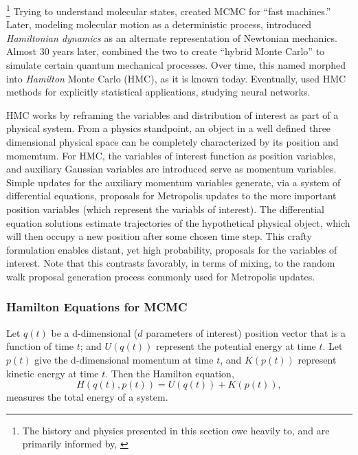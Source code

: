\footnote{The history and physics presented in this section owe heavily to, and are primarily informed by, \citep{Neal2011}} Trying to understand molecular states, \cite{Metropolis1953} created MCMC for ``fast machines.'' Later, modeling molecular motion as a deterministic process, \cite{Alder1959} introduced {\it Hamiltonian dynamics} as an alternate representation of Newtonian mechanics. Almost 30 years later, \cite{Duane1987} combined the two to create ``hybrid Monte Carlo'' to simulate certain quantum mechanical processes. Over time, this named morphed into {\it Hamilton} Monte Carlo (HMC), as it is known today. Eventually, \cite{Neal1996} used HMC methods for explicitly statistical applications, studying neural networks.

HMC works by reframing the variables and distribution of interest as part of a physical system. From a physics standpoint, an object in a well defined three dimensional physical space can be completely characterized by its position and momemtum. For HMC, the variables of interest function as position variables, and auxiliary Gaussian variables are introduced serve as momentum variables. Simple updates for the auxiliary momentum variables generate, via a system of differential equations, proposals for Metropolis updates to the more important position variables (which represent the variabls of interest). The differential equation solutions estimate trajectories of the hypothetical physical object, which will then occupy a new position after some chosen time step. This crafty formulation enables distant, yet high probability, proposals for the variables of interest. Note that this contrasts favorably, in terms of mixing, to the random walk proposal generation process commonly used for Metropolis updates.

\subsubsection{Hamilton Equations for MCMC} %

Let $q(t)$ be a d-dimensional ($d$ parameters of interest) position vector that is a function of time $t$; and $U(q(t))$ represent the potential energy at time $t$. Let $p(t)$ give the d-dimensional momentum at time $t$, and $K(p(t))$ represent kinetic energy at time $t$. Then the Hamilton equation,
\begin{equation}
H(q(t),p(t)) = U(q(t)) + K(p(t)),
\end{equation}
measures the total energy of a system. 

